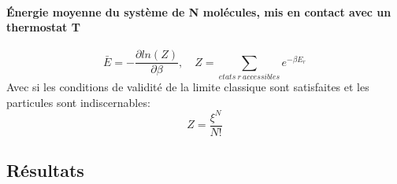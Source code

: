 \paragraph{Énergie moyenne du système de N molécules, mis en contact avec un thermostat T}

\[
	\bar{E}=-\frac{\partial ln(Z)}{\partial \beta}, \quad Z= \sum_{etats \ r \ accessibles}e^{-\beta E_r}
\]
Avec si les conditions de validité de la limite classique sont satisfaites et les particules sont indiscernables:
\[
	Z=\frac{\xi^N}{N!}
\]


\subsection{Résultats}


\begin{center}
\end{center}